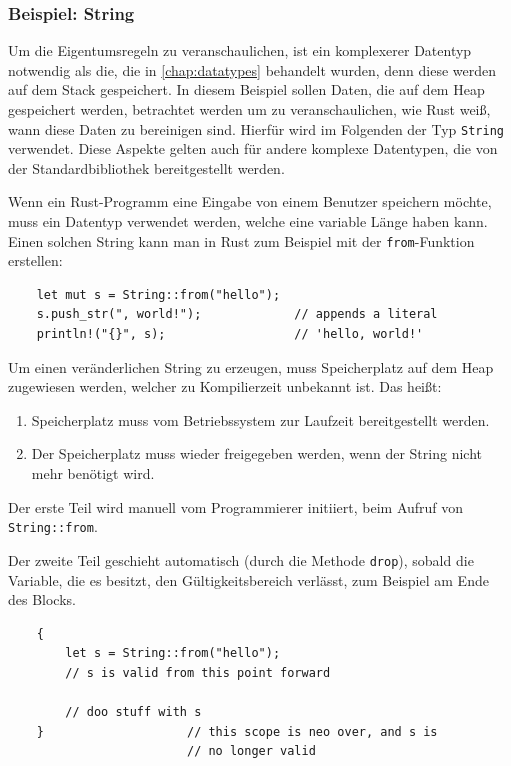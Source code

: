 \subsubsection{Beispiel: String}

Um die Eigentumsregeln zu veranschaulichen, ist ein komplexerer Datentyp not\-wen\-dig als die, die in \autoref{chap:datatypes} behandelt wurden, denn diese werden auf dem Stack gespeichert. In diesem Beispiel sollen Daten, die auf dem Heap gespeichert werden, betrachtet werden um zu veranschaulichen, wie Rust weiß, wann diese Daten zu bereinigen sind. Hierfür wird im Folgenden der Typ \verb"String" verwendet. Diese Aspekte gelten auch für andere komplexe Datentypen, die von der Standardbibliothek bereitgestellt werden.

Wenn ein Rust-Programm eine Eingabe von einem Benutzer speichern möchte, muss ein Datentyp verwendet werden, welche eine variable Länge haben kann. Einen solchen String kann man in Rust zum Beispiel mit der \verb"from"-Funktion erstellen:

\begin{lstlisting}
    let mut s = String::from("hello");
    s.push_str(", world!");             // appends a literal
    println!("{}", s);                  // 'hello, world!'
\end{lstlisting}

Um einen veränderlichen String zu erzeugen, muss Speicherplatz auf dem Heap zugewiesen werden, welcher zu Kompilierzeit unbekannt ist. Das heißt:

\begin{enumerate}
    \item Speicherplatz muss vom Betriebssystem zur Laufzeit bereitgestellt werden.
    \item Der Speicherplatz muss wieder freigegeben werden, wenn der String nicht mehr benötigt wird.
\end{enumerate}

Der erste Teil wird manuell vom Programmierer initiiert, beim Aufruf von \verb"String::from".

Der zweite Teil geschieht automatisch (durch die Methode \verb"drop"), sobald die Variable, die es besitzt, den Gültigkeitsbereich verlässt, zum Beispiel am Ende des Blocks.

\begin{lstlisting}
    {
        let s = String::from("hello");
        // s is valid from this point forward
    
        // doo stuff with s
    }                    // this scope is neo over, and s is
                         // no longer valid
\end{lstlisting}

